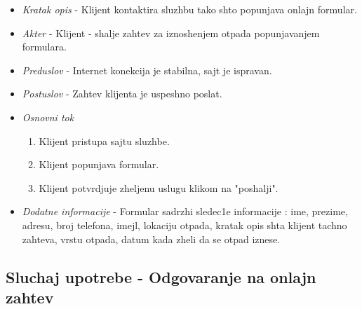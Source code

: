 \documentclass[10 pt]{article}
\begin{document}
		\begin{itemize}
			
			\item\textit{Kratak opis} - Klijent kontaktira sluzhbu tako shto popunjava onlajn formular.
	
			\item\textit{Akter} - Klijent - shalje zahtev za iznoshenjem otpada popunjavanjem formulara.
			
			\item\textit{Preduslov} - Internet konekcija je stabilna, sajt je ispravan.
			
			\item\textit{Postuslov} - Zahtev klijenta je uspeshno poslat.

			
			\item\textit{Osnovni tok} 
				\begin{enumerate}
					\item Klijent pristupa sajtu sluzhbe.

					\item Klijent popunjava formular.

					\item Klijent potvrdjuje zheljenu uslugu klikom na "poshalji".
				\end{enumerate}
			
			\item\textit{Dodatne informacije}
- Formular sadrzhi sledec1e informacije : ime, prezime, adresu, broj telefona, imejl, lokaciju otpada, kratak opis shta klijent tachno zahteva, vrstu otpada, datum kada zheli da se otpad iznese.
			

		\end{itemize}
	\subsection{Sluchaj upotrebe - Odgovaranje na onlajn zahtev}
	
\end{document}
